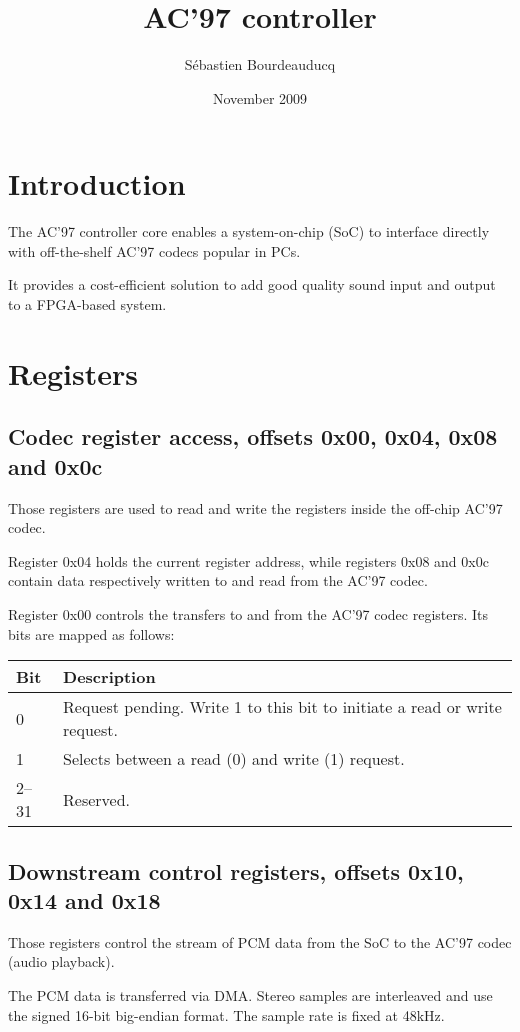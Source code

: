 \documentclass[a4paper,11pt]{article}
\title{AC'97 controller}
\author{S\'ebastien Bourdeauducq}
\date{November 2009}
\begin{document}
\setlength{\parindent}{0pt}
\setlength{\parskip}{5pt}
\maketitle{}
\section{Introduction}
The AC'97 controller core enables a system-on-chip (SoC) to interface directly with off-the-shelf AC'97 codecs popular in PCs.

It provides a cost-efficient solution to add good quality sound input and output to a FPGA-based system.

\section{Registers}
\subsection{Codec register access, offsets 0x00, 0x04, 0x08 and 0x0c}
Those registers are used to read and write the registers inside the off-chip AC'97 codec.

Register 0x04 holds the current register address, while registers 0x08 and 0x0c contain data respectively written to and read from the AC'97 codec.

Register 0x00 controls the transfers to and from the AC'97 codec registers. Its bits are mapped as follows:

\begin{tabularx}{\textwidth}{|l|X|}
\hline
\textbf{Bit} & \textbf{Description} \\
\hline
0 & Request pending. Write 1 to this bit to initiate a read or write request. \\
\hline
1 & Selects between a read (0) and write (1) request. \\
\hline
2--31 & Reserved. \\
\hline
\end{tabularx}

\subsection{Downstream control registers, offsets 0x10, 0x14 and 0x18}
Those registers control the stream of PCM data from the SoC to the AC'97 codec (audio playback).

The PCM data is transferred via DMA. Stereo samples are interleaved and use the signed 16-bit big-endian format. The sample rate is fixed at 48kHz.
\end{document}
